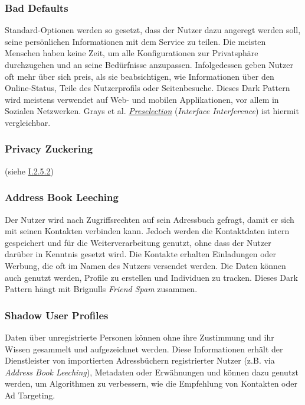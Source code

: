 \documentclass[a4paper]{article}
\begin{document}
\subsubsection{Bad Defaults}
\label{sssec:bad_defaults}
Standard-Optionen werden so gesetzt, dass der Nutzer dazu angeregt werden soll, seine persönlichen Informationen mit dem Service zu teilen. Die meisten Menschen haben keine Zeit, um alle Konfigurationen zur Privatsphäre durchzugehen und an seine Bedürfnisse anzupassen. Infolgedessen geben Nutzer oft mehr über sich preis, als sie beabsichtigen, wie Informationen über den Online-Status, Teile des Nutzerprofils oder Seitenbesuche. Dieses Dark Pattern wird meistens verwendet auf Web- und mobilen Applikationen, vor allem in Sozialen Netzwerken.\newline 
Grays et al. \hyperref[para:preselection]{\textit{Preselection}} (\textit{Interface Interference}) ist hiermit vergleichbar.

\subsubsection{Privacy Zuckering}
\label{sssec:privacy_zuckering2}
(siehe \hyperref[para:privacy_zuckering]{I.2.5.2})

\subsubsection{Address Book Leeching}
\label{sssec:address_book_leeching}
Der Nutzer wird nach Zugriffsrechten auf sein Adressbuch gefragt, damit er sich mit seinen Kontakten verbinden kann. Jedoch werden die Kontaktdaten intern gespeichert und für die Weiterverarbeitung genutzt, ohne dass der Nutzer darüber in Kenntnis gesetzt wird. Die Kontakte erhalten Einladungen oder Werbung, die oft im Namen des Nutzers versendet werden. Die Daten können auch genutzt werden, Profile zu erstellen und Individuen zu tracken.\newline
Dieses Dark Pattern hängt mit Brignulls \textit{Friend Spam} zusammen.

\subsubsection{Shadow User Profiles}
\label{sssec:shadow_user_profiles}
Daten über unregistrierte Personen können ohne ihre Zustimmung und ihr Wissen gesammelt und aufgezeichnet werden. Diese Informationen erhält der Dienstleister von importierten Adressbüchern registrierter Nutzer (z.B. via \textit{Address Book Leeching}), Metadaten oder Erwähnungen und können dazu genutzt werden, um Algorithmen zu verbessern, wie die Empfehlung von Kontakten oder Ad Targeting.
\end{document}
